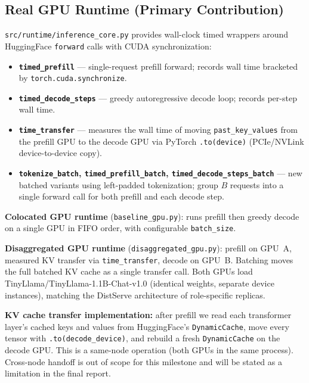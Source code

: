 \documentclass[11pt,letterpaper]{article}
\begin{document}
\subsection{Real GPU Runtime (Primary Contribution)}

\texttt{src/runtime/inference\_core.py} provides wall-clock timed wrappers around
HuggingFace \texttt{forward} calls with CUDA synchronization:

\begin{itemize}[noitemsep,topsep=2pt]
  \item \textbf{\texttt{timed\_prefill}} --- single-request prefill forward; records
        wall time bracketed by \texttt{torch.cuda.synchronize}.
  \item \textbf{\texttt{timed\_decode\_steps}} --- greedy autoregressive decode loop;
        records per-step wall time.
  \item \textbf{\texttt{time\_transfer}} --- measures the wall time of moving
        \texttt{past\_key\_values} from the prefill GPU to the decode GPU via
        PyTorch \texttt{.to(device)} (PCIe/NVLink device-to-device copy).
  \item \textbf{\texttt{tokenize\_batch}, \texttt{timed\_prefill\_batch},
        \texttt{timed\_decode\_steps\_batch}} --- new batched variants using
        left-padded tokenization; group $B$ requests into a single forward call
        for both prefill and each decode step.
\end{itemize}

\textbf{Colocated GPU runtime} (\texttt{baseline\_gpu.py}): runs prefill then greedy
decode on a single GPU in FIFO order, with configurable \texttt{batch\_size}.

\textbf{Disaggregated GPU runtime} (\texttt{disaggregated\_gpu.py}): prefill on
GPU~A, measured KV transfer via \texttt{time\_transfer}, decode on GPU~B.
Batching moves the full batched KV cache as a single transfer call.
Both GPUs load TinyLlama/TinyLlama-1.1B-Chat-v1.0 (identical weights, separate
device instances), matching the DistServe architecture of role-specific replicas.

\textbf{KV cache transfer implementation:} after prefill we read each transformer
layer's cached keys and values from HuggingFace's \texttt{DynamicCache},
move every tensor with \texttt{.to(decode\_device)}, and rebuild a fresh
\texttt{DynamicCache} on the decode GPU. This is a same-node operation
(both GPUs in the same process). Cross-node handoff is out of scope for this
milestone and will be stated as a limitation in the final report.
\end{document}
